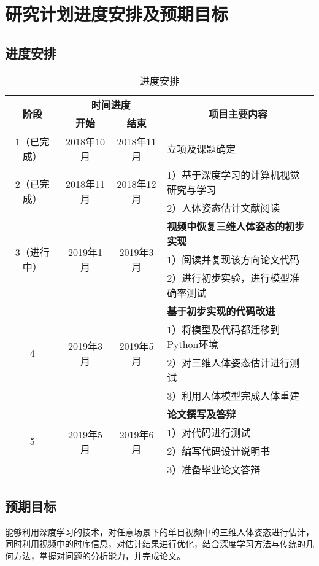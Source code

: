 
\section{研究计划进度安排及预期目标}

\subsection{进度安排}
\begin{table}[htbp]
    \centering
    \begin{tabular}{|c|c|c|l|l|l|l|}
    \hline
    \multirow{2}[4]{*}{\textbf{阶段}} & \multicolumn{2}{c|}{\textbf{时间进度 }} & \multicolumn{4}{c|}{\multirow{2}[4]{*}{\textbf{项目主要内容}}} \\
    \cline{2-3} & \textbf{开始} & \textbf{结束} & \multicolumn{4}{c|}{} \\
    \hline
    1（已完成） & 2018年10月 & 2018年11月 & \multicolumn{4}{l|}{立项及课题确定} \\
    \hline
    \multirow{2}[4]{*}{2（已完成）} & \multirow{2}[4]{*}{2018年11月} & \multirow{2}[4]{*}{2018年12月} & \multicolumn{4}{l|}{1）基于深度学习的计算机视觉研究与学习} \\
    \cline{4-7} & & & \multicolumn{4}{l|}{2）人体姿态估计文献阅读} \\
    \hline
    \multirow{3}[6]{*}{3（进行中）} & \multirow{3}[6]{*}{2019年1月} & \multirow{3}[6]{*}{2019年3月} & \multicolumn{4}{l|}{\textbf{视频中恢复三维人体姿态的初步实现}} \\
    \cline{4-7} & & & \multicolumn{4}{l|}{1）阅读并复现该方向论文代码} \\
    \cline{4-7} & & & \multicolumn{4}{l|}{2）进行初步实验，进行模型准确率测试} \\
    \hline
    \multirow{4}[8]{*}{4} & \multirow{4}[8]{*}{2019年3月} & \multirow{4}[8]{*}{2019年5月} & \multicolumn{4}{l|}{\textbf{基于初步实现的代码改进}} \\
    \cline{4-7} & & & \multicolumn{4}{l|}{1）将模型及代码都迁移到Python环境} \\
    \cline{4-7} & & & \multicolumn{4}{l|}{2）对三维人体姿态估计进行测试} \\
    \cline{4-7} & & & \multicolumn{4}{l|}{3）利用人体模型完成人体重建} \\
    \hline
    \multirow{4}[8]{*}{5} & \multirow{4}[8]{*}{2019年5月} & \multirow{4}[8]{*}{2019年6月} & \multicolumn{4}{l|}{\textbf{论文撰写及答辩}} \\
    \cline{4-7} & & & \multicolumn{4}{l|}{1）对代码进行测试} \\
    \cline{4-7} & & & \multicolumn{4}{l|}{2）编写代码设计说明书} \\
    \cline{4-7} & & & \multicolumn{4}{l|}{3）准备毕业论文答辩} \\
    \hline
    \end{tabular}%
    \label{tab:plan}%
    \caption{进度安排}
\end{table}%

\subsection{预期目标}
能够利用深度学习的技术，对任意场景下的单目视频中的三维人体姿态进行估计，同时利用视频中的时序信息，对估计结果进行优化，结合深度学习方法与传统的几何方法，掌握对问题的分析能力，并完成论文。


